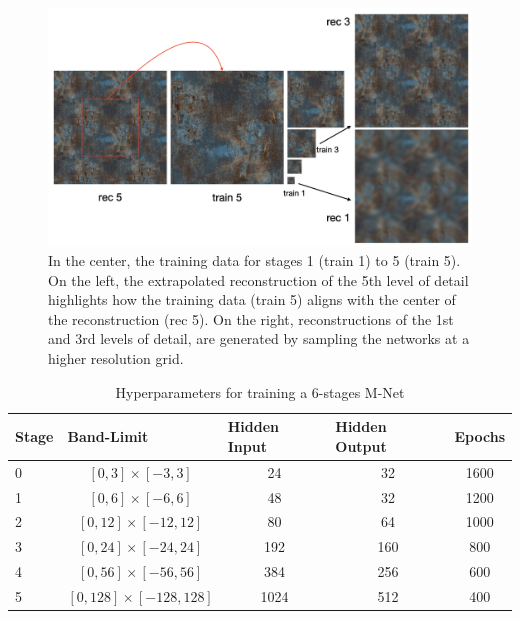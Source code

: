 \begin{figure}[!ht]
    \centering
    \includegraphics[width=0.90\linewidth]{img/ch6/diagram.png}
    \caption{In the center, the training data for stages 1 (train 1) to 5 (train 5). On the left, the extrapolated reconstruction of the 5th level of detail highlights how the training data (train 5) aligns with the center of the reconstruction (rec 5). On the right, reconstructions of the 1st and 3rd levels of detail, are generated by sampling the networks at a higher resolution grid.}
    \label{f:mr-periodic}
\end{figure}


\begin{table}[h]
\small
\begin{tabular}{|l|c|c|c|c|}
\hline
\textbf{Stage} & \multicolumn{1}{l|}{\textbf{Band-Limit}} & \multicolumn{1}{l|}{\textbf{Hidden Input}} & \multicolumn{1}{l|}{\textbf{Hidden Output}} & \multicolumn{1}{l|}{\textbf{Epochs}} \\ \hline
 0     & $[0, 3]\times[-3, 3]$                       & 24                                & 32          &  1600                     \\
 1     & $[0, 6]\times[-6, 6]$                       & 48                                & 32         &  1200                      \\
 2     & $[0, 12]\times[-12, 12]$                     & 80                                & 64             & 1000                   \\
 3     & $[0, 24]\times[-24, 24]$                     & 192                               & 160           &   800                  \\
 4     & $[0, 56]\times[-56, 56]$                     & 384                               & 256             &  600                 \\
 5     & $[0, 128]\times[-128, 128]$                   & 1024                              & 512            &   400                 \\ \hline
\end{tabular}
\caption{Hyperparameters for training a 6-stages M-Net}
\end{table}\label{tab:mnet-architecture}


